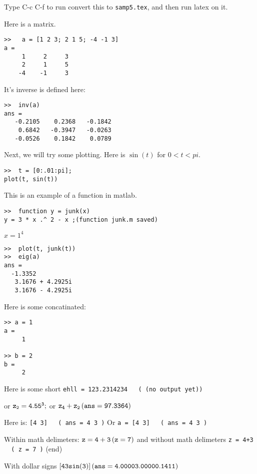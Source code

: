 \documentclass{notebook}
\begin{document}
Type C-c C-f to run convert this to {\tt samp5.tex}, and then run latex on it. 


Here is a matrix.
\begin{verbatim}>>   a = [1 2 3; 2 1 5; -4 -1 3]  
a =
     1     2     3
     2     1     5
    -4    -1     3
\end{verbatim} It's inverse is defined here:
\begin{verbatim}>>  inv(a)  
ans =
   -0.2105    0.2368   -0.1842
    0.6842   -0.3947   -0.0263
   -0.0526    0.1842    0.0789
\end{verbatim}
Next, we will try some plotting.  Here is $\sin(t)$ for $0 < t < pi$.
\begin{verbatim}>>  t = [0:.01:pi];
plot(t, sin(t))\end{verbatim}
This is an example of a function in matlab.
\begin{verbatim}>>  function y = junk(x)
y = 3 * x .^ 2 - x ;(function junk.m saved)\end{verbatim}
$x=1^4$
\begin{verbatim}>>  plot(t, junk(t)) 
>>  eig(a) 
ans =
  -1.3352          
   3.1676 + 4.2925i
   3.1676 - 4.2925i
\end{verbatim}
Here is some concatinated:
\begin{verbatim}>> a = 1  
a =
     1

>> b = 2  
b =
     2
\end{verbatim}

Here is some short
{ \tt  ehll = 123.2314234   \, (
(no output yet))} 

 or
${ \tt z_2 = 4.55^3;  } $ or 
${ \tt  z_4 + z_2   \, (
ans =
   97.3364
)}  $

Here is:
{ \tt  [4  3]   \, (
ans =
     4     3
)} 
Or { \tt  a = [4  3]   \, (
ans =
     4     3
)} 

Within math delimeters: $ { \tt  z = 4+3   \, (
z =
     7
)} $
and without math delimeters { \tt  z = 4+3   \, (
z =
     7
)} (end)


With dollar signs ${ \tt [4 3 sin(3)]   \, (
ans =
    4.0000    3.0000    0.1411
)} $
\end{document}
